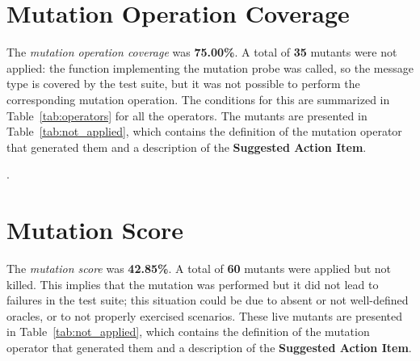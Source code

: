 \section{Mutation Operation Coverage}

The \emph{mutation operation coverage} was \textbf{75.00\%}. A total of \textbf{35} mutants were not applied: the function implementing the mutation probe was called, so the message type is covered by the test suite, but it was not possible to perform the corresponding mutation operation.
The conditions for this are summarized in Table~\ref{tab:operators} for all the operators.
The mutants are presented in Table~\ref{tab:not_applied}, which contains the definition of the mutation operator that generated them and a description of the \textbf{Suggested Action Item}.

.

 


\section{Mutation Score}

 The \emph{mutation score} was \textbf{42.85\%}. A total of \textbf{60} mutants were applied but not killed. This implies that the mutation was performed but it did not lead to failures in the test suite; this situation could be due to absent or not well-defined oracles, or to not properly exercised scenarios.
 These live mutants are presented in Table~\ref{tab:not_applied}, which contains the definition of the mutation operator that generated them and a description of the \textbf{Suggested Action Item}.
 


